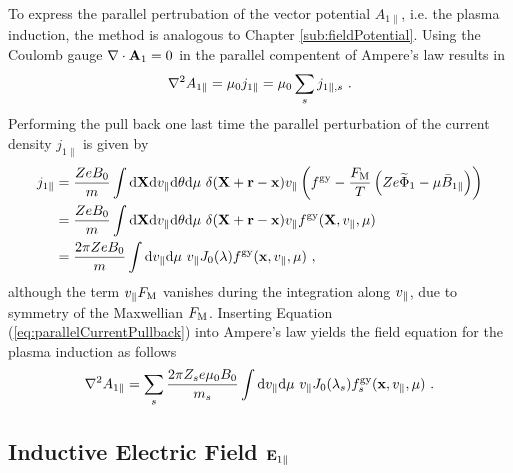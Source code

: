 To express the parallel pertrubation of the vector potential $A_{1\parallel}$, i.e. the plasma induction, the method is analogous to Chapter \ref{sub:fieldPotential}. Using the Coulomb gauge $\nabla \cdot \boldsymbol{\mathbf{A}}_1 = 0$ in the parallel compentent of Ampere's law results in
\begin{gather}
	\nabla^2 A_{1\parallel} = \mu_0 j_{1\parallel} = \mu_0 \sum_s j_{1\parallel,s}~.
	\label{eq:parallelAmpereLaw}
\end{gather}
Performing the pull back one last time the parallel perturbation of the current density $j_{1\parallel}$ is given by
\begin{gather}
	\begin{aligned}
		j_{1\parallel} &= \frac{Ze B_0}{m} \int \mathrm{d}\boldsymbol{\mathbf{X}}\mathrm{d}v_\parallel\mathrm{d}\theta\mathrm{d}\mu ~ \delta(\boldsymbol{\mathbf{X}} + \boldsymbol{\mathbf{r}} - \boldsymbol{\mathbf{x}}) v_\parallel \left(f^{\mathrm{gy}} - \frac{F_\mathrm{M}}{T}\left(Ze \widetilde{\Phi}_1 - \mu \bar{B}_{1\parallel}\right) \right)\\
					   &= \frac{Ze B_0}{m} \int \mathrm{d}\boldsymbol{\mathbf{X}}\mathrm{d}v_\parallel\mathrm{d}\theta\mathrm{d}\mu ~ \delta(\boldsymbol{\mathbf{X}} + \boldsymbol{\mathbf{r}} - \boldsymbol{\mathbf{x}}) v_\parallel f^{\mathrm{gy}}(\boldsymbol{\mathbf{X}}, v_\parallel, \mu) \\
					   &= \frac{2\pi Ze B_0}{m} \int \mathrm{d}v_\parallel\mathrm{d}\mu ~ v_\parallel J_0(\lambda) f^{\mathrm{gy}}(\boldsymbol{\mathbf{x}}, v_\parallel, \mu)~,
	\end{aligned}
	\label{eq:parallelCurrentPullback}
\end{gather}
although the term $v_\parallel F_\mathrm{M}$ vanishes during the integration along $v_\parallel$, due to symmetry of the Maxwellian $F_\mathrm{M}$. 
Inserting Equation (\ref{eq:parallelCurrentPullback}) into Ampere's law yields the field equation for the plasma induction as follows
\begin{gather}
	\nabla^2 A_{1\parallel} = \sum_s \frac{2\pi Z_se \mu_0 B_0}{m_s}  \int \mathrm{d}v_\parallel\mathrm{d}\mu ~ v_\parallel J_0(\lambda_s) f^{\mathrm{gy}}_s(\boldsymbol{\mathbf{x}}, v_\parallel, \mu)~.
	\label{eq:fieldInduction}
\end{gather}
\newpage

\subsection{Inductive Electric Field $\boldsymbol{\mathbf{E}}_{1 \parallel}$}
\label{sub:fieldEpar}

